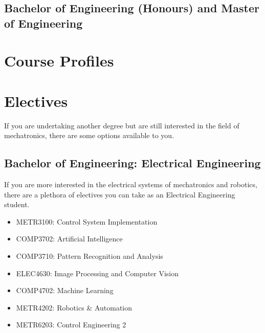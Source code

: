 \documentclass[a4paper,12pt]{report}
\begin{document}
\newpage

\section{Bachelor of Engineering (Honours) and Master of Engineering}


\chapter{Course Profiles}




\chapter{Electives}
If you are undertaking another degree but are still interested in the field of mechatronics, there are some options available to you.

\section{Bachelor of Engineering: Electrical Engineering}
\vspace*{3mm}
If you are more interested in the electrical systems of mechatronics and robotics, there are a plethora of electives you can take as an Electrical Engineering student.
\begin{multicols}{2}
    \begin{itemize}
        \item METR3100: Control System Implementation
        \item COMP3702: Artificial Intelligence
        \item COMP3710: Pattern Recognition and Analysis
        \item ELEC4630: Image Processing and Computer Vision
        \item COMP4702: Machine Learning
        \item METR4202: Robotics \& Automation
        \item METR6203: Control Engineering 2
    \end{itemize}
\end{multicols}
\end{document}
